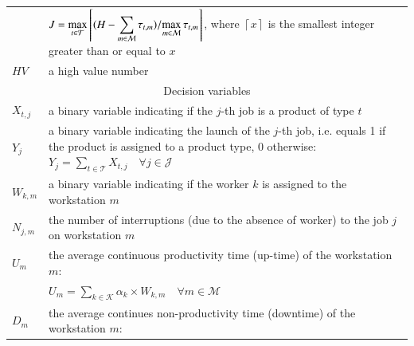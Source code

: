 \documentclass[review,12pt, 3p, times]{elsarticle}
\begin{document}
\begin{longtable}{p{} p{}}
	              & $J=\displaystyle\max_{t\in{\cal T}}\left\lceil {(H-\sum_{m\in\mathcal{M}} \tau_{t,m})}/{\max_{m\in\mathcal{M}} \tau_{t,m}}\right\rceil$, where $\left\lceil x    \right\rceil $   is the smallest integer greater than or equal to $x$ \\
	$HV$          & a high value number                                                                                                                                                                                                                    \\
	\hline
	\multicolumn{2}{c}{Decision variables }\\
	\hline		
	$X_{t,j}$     & a binary variable indicating if the $j$-th job is a product of type $t$                                                                                                                                                                                  \\
	$Y_j$         & a binary variable indicating the launch of the $j$-th job, i.e. equals 1 if the product is assigned to a product type, 0 otherwise:                   $Y_j = {\sum_{t\in \mathcal{T}} X_{t,j}} \quad\forall{j \in\mathcal{J} }$                                                                                                                                                              \\
	$W_{k,m}$     & a binary variable indicating if the worker $k$ is assigned to the workstation $m$                                                                                                                                                      \\
	$N_{j,m}$     & the number of interruptions (due to the absence of worker) to the job $j$ on workstation  $m$                                                                                                                                      \\
	$U_m$         & the average continuous productivity time (up-time) of the workstation $m$:                                                                                                                                                             \\ 
	              & $U_m=\sum_{k\in \mathcal{K}} \alpha_k \times W_{k,m} \quad \forall{ m \in  \mathcal{M}}$                                                                                                                                               \\
	$D_m$         & the average continues non-productivity time (downtime) of the workstation $m$:                                                                                                                                                         \\

\end{longtable}
\end{document}
